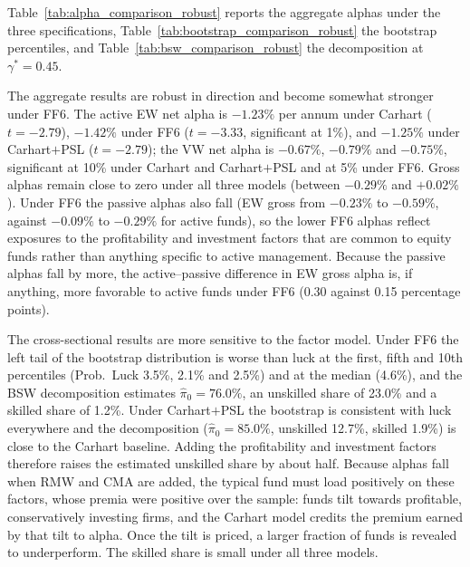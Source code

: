 \documentclass[12pt, oneside]{report}
\begin{document}






\noindent Table~\ref{tab:alpha_comparison_robust} reports the aggregate
alphas under the three specifications,
Table~\ref{tab:bootstrap_comparison_robust} the
\textcite{FamaFrench2010} bootstrap percentiles, and
Table~\ref{tab:bsw_comparison_robust} the
\textcite{BarrasScailletWermers2010} decomposition at $\gamma^* = 0.45$.

The aggregate results are robust in direction and become somewhat
stronger under FF6. The active EW net alpha is $-1.23\%$ per annum under
Carhart ($t = -2.79$), $-1.42\%$ under FF6 ($t = -3.33$, significant at
1\%), and $-1.25\%$ under Carhart$+$PSL ($t = -2.79$); the VW net alpha is
$-0.67\%$, $-0.79\%$ and $-0.75\%$, significant at 10\% under Carhart and
Carhart$+$PSL and at 5\% under FF6. Gross alphas remain close to zero under all three
models (between $-0.29\%$ and $+0.02\%$). Under FF6 the passive alphas
also fall (EW gross from $-0.23\%$ to $-0.59\%$, against $-0.09\%$ to
$-0.29\%$ for active funds), so the
lower FF6 alphas reflect exposures to the profitability and investment
factors that are common to equity funds rather than anything specific to
active management. Because the passive alphas fall by more, the
active--passive difference in EW gross alpha is, if anything, more
favorable to active funds under FF6 (0.30 against 0.15 percentage
points).

The cross-sectional results are more sensitive to the factor model. Under
FF6 the left tail of the bootstrap distribution is worse than luck at the
first, fifth and 10th percentiles (Prob.\ Luck 3.5\%, 2.1\% and 2.5\%) and at the median (4.6\%), and
the BSW decomposition estimates $\hat{\pi}_0 = 76.0\%$, an unskilled
share of 23.0\% and a skilled share of 1.2\%. Under Carhart$+$PSL the
bootstrap is consistent with luck everywhere and the decomposition
($\hat{\pi}_0 = 85.0\%$, unskilled 12.7\%, skilled 1.9\%) is close to the
Carhart baseline. Adding the profitability and investment factors
therefore raises the estimated unskilled share by about half. Because alphas
fall when RMW and CMA are added, the typical fund must load positively on
these factors, whose premia were positive over the sample: funds tilt
towards profitable, conservatively investing firms, and the Carhart model
credits the premium earned by that tilt to alpha. Once the tilt is priced,
a larger fraction of funds is revealed to underperform. The skilled share is small under all three models.
\end{document}
